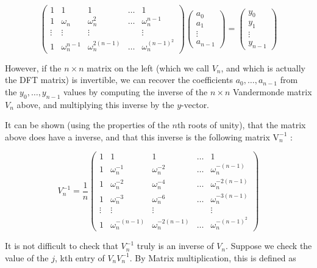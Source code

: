 $$
\left(\begin{array}{ccccc}
1 & 1 & 1 & \ldots & 1 \\
1 & \omega_{n} & \omega_{n}^{2} & \ldots & \omega_{n}^{n-1} \\
\vdots & \vdots & \vdots & & \vdots \\
1 & \omega_{n}^{n-1} & \omega_{n}^{2(n-1)} & \ldots & \omega_{n}^{(n-1)^{2}}
\end{array}\right)\left(\begin{array}{c}
a_{0} \\
a_{1} \\
\vdots \\
a_{n-1}
\end{array}\right)=\left(\begin{array}{c}
y_{0} \\
y_{1} \\
\vdots \\
y_{n-1}
\end{array}\right)
$$

However, if the $n \times n$ matrix on the left (which we call $V_{n}$, and which is actually the DFT matrix) is invertible, we can recover the coefficients $a_{0}, \ldots, a_{n-1}$ from the $y_{0}, \ldots, y_{n-1}$ values by computing the inverse of the $n \times n$ Vandermonde matrix $V_{n}$ above, and multiplying this inverse by the $y$-vector.

It can be shown (using the properties of the $n$th roots of unity), that the matrix above does have a inverse, and that this inverse is the following matrix $\mathrm{V}_{n}^{-1}$ :

$$
V_{n}^{-1}=\frac{1}{n}\left(\begin{array}{ccccc}
1 & 1 & 1 & \ldots & 1 \\
1 & \omega_{n}^{-1} & \omega_{n}^{-2} & \ldots & \omega_{n}^{-(n-1)} \\
1 & \omega_{n}^{-2} & \omega_{n}^{-4} & \ldots & \omega_{n}^{-2(n-1)} \\
1 & \omega_{n}^{-3} & \omega_{n}^{-6} & \ldots & \omega_{n}^{-3(n-1)} \\
\vdots & \vdots & \vdots & & \vdots \\
1 & \omega_{n}^{-(n-1)} & \omega_{n}^{-2(n-1)} & \ldots & \omega_{n}^{-(n-1)^{2}}
\end{array}\right)
$$

It is not difficult to check that $V_{n}^{-1}$ truly is an inverse of $V_{n}$. Suppose we check the value of the $j$, kth entry of $V_{n} V_{n}^{-1}$. By Matrix multiplication, this is defined as

